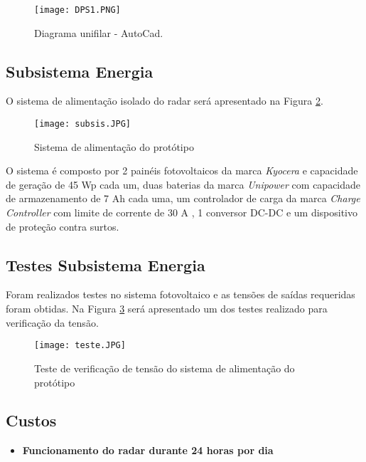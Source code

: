 \begin{figure}[H]
\centering
\texttt{[image: DPS1.PNG]}
\caption{Diagrama unifilar - AutoCad.}
\label{fig:diagrama}
\end{figure}



\subsection{Subsistema Energia}

O sistema de alimentação isolado do radar será apresentado na Figura \ref{fig:su}.

\begin{figure}[H]
\centering
\texttt{[image: subsis.JPG]}

\caption{\label{fig:su}Sistema de alimentação do protótipo}
\end{figure}

O sistema é composto por 2 painéis fotovoltaicos da marca \textit{Kyocera} e capacidade de geração de 45 Wp cada um, duas baterias da marca \textit{Unipower} com capacidade de armazenamento de 7 Ah cada uma, um controlador de carga da marca \textit{Charge Controller} com limite de corrente de 30 A , 1 conversor DC-DC e um dispositivo de proteção contra surtos.

\subsection{Testes Subsistema Energia}

Foram realizados testes no sistema fotovoltaico e as tensões de saídas requeridas foram obtidas. Na Figura \ref{fig:teste} será apresentado um dos testes realizado para verificação da tensão.

\begin{figure}[H]
\centering
\texttt{[image: teste.JPG]}

\caption{\label{fig:teste}Teste de verificação de tensão do sistema de alimentação do protótipo}
\end{figure}


\subsection{Custos}

\begin{itemize}
    \item \textbf{Funcionamento do radar durante 24 horas por dia}
\end{itemize}

